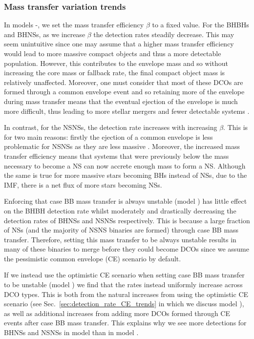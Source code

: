 \subsubsection{Mass transfer variation trends}

In models \modBetaLow{}-\modBetaHigh{}, we set the mass transfer efficiency $\beta$ to a fixed value. For the BHBHs and BHNSs, as we increase $\beta$ the detection rates steadily decrease. This may seem unintuitive since one may assume that a higher mass transfer efficiency would lead to more massive compact objects and thus a more detectable population. However, this contributes to the envelope mass and so without increasing the core mass or fallback rate, the final compact object mass is relatively unaffected. Moreover, one must consider that most of these DCOs are formed through a common envelope event and so retaining more of the envelope during mass transfer means that the eventual ejection of the envelope is much more difficult, thus leading to more stellar mergers and fewer detectable systems \citep[e.g.][]{Kruckow+2018}.

In contrast, for the NSNSs, the detection rate increases with increasing $\beta$. This is for two main reasons: firstly the ejection of a common envelope is less problematic for NSNSs as they are less massive \citep[e.g.][]{Kruckow+2018}. Moreover, the increased mass transfer efficiency means that systems that were previously below the mass necessary to become a NS can now accrete enough mass to form a NS. Although the same is true for more massive stars becoming BHs instead of NSs, due to the IMF, there is a net flux of more stars becoming NSs.

Enforcing that case BB mass transfer is always unstable (model \modCaseBB{}) has little effect on the BHBH detection rate whilst moderately and drastically decreasing the detection rates of BHNSs and NSNSs respectively. This is because a large fraction of NSs (and the majority of NSNS binaries are formed) through case BB mass transfer. Therefore, setting this mass transfer to be always unstable results in many of these binaries to merge before they could become DCOs since we assume the pessimistic common envelope (CE) scenario by default.

If we instead use the optimistic CE scenario when setting case BB mass transfer to be unstable (model \modCaseBBOpt{}) we find that the rates instead uniformly increase across DCO types. This is both from the natural increases from using the optimistic CE scenario (see Sec.~\ref{sec:detection_rate_CE_trends} in which we discuss model \modOpt{}), as well as additional increases from adding more DCOs formed through CE events after case BB mass transfer. This explains why we see more detections for BHNSs and NSNSs in model \modCaseBBOpt{} than in model \modOpt{}.

